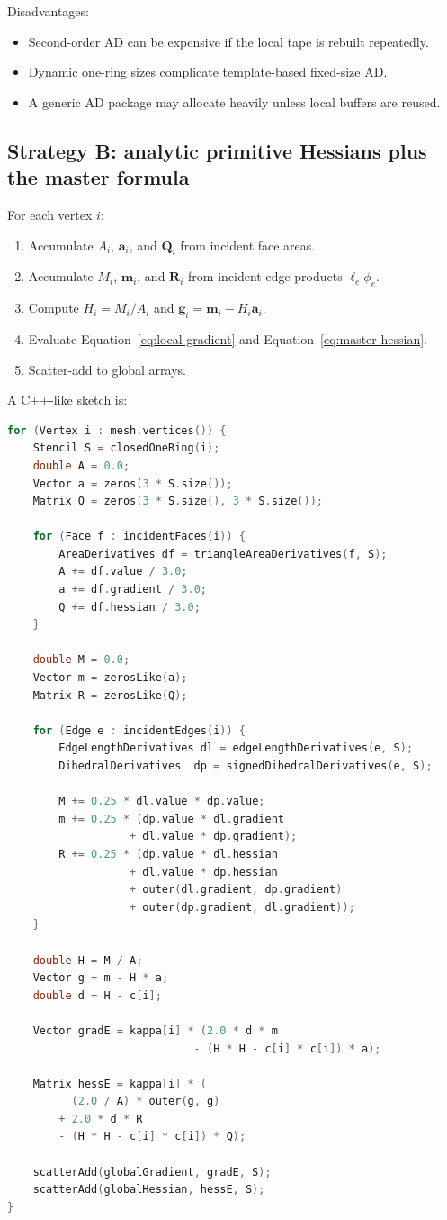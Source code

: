 \documentclass[11pt]{article}
\newcommand{\aV}{\mathbf{a}}
\newcommand{\mV}{\mathbf{m}}
\newcommand{\gV}{\mathbf{g}}
\newcommand{\Q}{\mathbf{Q}}
\newcommand{\Mmat}{\mathbf{R}}
\begin{document}
Disadvantages:
\begin{itemize}
  \item Second-order AD can be expensive if the local tape is rebuilt repeatedly.
  \item Dynamic one-ring sizes complicate template-based fixed-size AD.
  \item A generic AD package may allocate heavily unless local buffers are reused.
\end{itemize}

\subsection{Strategy B: analytic primitive Hessians plus the master formula}

For each vertex $i$:
\begin{enumerate}
  \item Accumulate $A_i$, $\aV_i$, and $\Q_i$ from incident face areas.
  \item Accumulate $M_i$, $\mV_i$, and $\Mmat_i$ from incident edge products $\ell_e\phi_e$.
  \item Compute $H_i=M_i/A_i$ and $\gV_i=\mV_i-H_i\aV_i$.
  \item Evaluate Equation~\eqref{eq:local-gradient} and Equation~\eqref{eq:master-hessian}.
  \item Scatter-add to global arrays.
\end{enumerate}

A C++-like sketch is:
\begin{lstlisting}[language=C++]
for (Vertex i : mesh.vertices()) {
    Stencil S = closedOneRing(i);
    double A = 0.0;
    Vector a = zeros(3 * S.size());
    Matrix Q = zeros(3 * S.size(), 3 * S.size());

    for (Face f : incidentFaces(i)) {
        AreaDerivatives df = triangleAreaDerivatives(f, S);
        A += df.value / 3.0;
        a += df.gradient / 3.0;
        Q += df.hessian / 3.0;
    }

    double M = 0.0;
    Vector m = zerosLike(a);
    Matrix R = zerosLike(Q);

    for (Edge e : incidentEdges(i)) {
        EdgeLengthDerivatives dl = edgeLengthDerivatives(e, S);
        DihedralDerivatives  dp = signedDihedralDerivatives(e, S);

        M += 0.25 * dl.value * dp.value;
        m += 0.25 * (dp.value * dl.gradient
                   + dl.value * dp.gradient);
        R += 0.25 * (dp.value * dl.hessian
                   + dl.value * dp.hessian
                   + outer(dl.gradient, dp.gradient)
                   + outer(dp.gradient, dl.gradient));
    }

    double H = M / A;
    Vector g = m - H * a;
    double d = H - c[i];

    Vector gradE = kappa[i] * (2.0 * d * m
                             - (H * H - c[i] * c[i]) * a);

    Matrix hessE = kappa[i] * (
          (2.0 / A) * outer(g, g)
        + 2.0 * d * R
        - (H * H - c[i] * c[i]) * Q);

    scatterAdd(globalGradient, gradE, S);
    scatterAdd(globalHessian, hessE, S);
}
\end{lstlisting}
\end{document}
